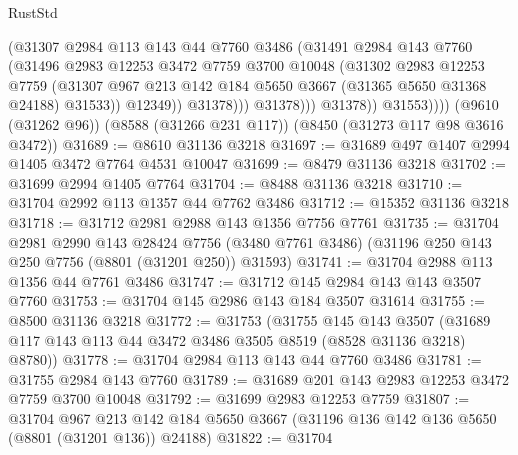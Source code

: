 \begin{lexlean}{RustStd}
\begin{coremodule}
                          (@31307
                            @2984
                            @113
                            @143
                            @44
                            @7760
                            @3486
                            (@31491
                              @2984
                              @143
                              @7760
                              (@31496
                                @2983
                                @12253
                                @3472
                                @7759
                                @3700
                                @10048
                                (@31302
                                  @2983
                                  @12253
                                  @7759
                                  (@31307
                                    @967
                                    @213
                                    @142
                                    @184
                                    @5650
                                    @3667
                                    (@31365 @5650 @31368 @24188)
                                    @31533))
                                @12349))
                            @31378)))
                      @31378)))
                @31378))
            @31553))))
    (@9610 (@31262 @96))
    (@8588 (@31266 @231 @117))
    (@8450 (@31273 @117 @98 @3616 @3472))
@31689 := @8610 @31136 @3218
@31697 := @31689 @497 @1407 @2994 @1405 @3472 @7764 @4531 @10047
@31699 := @8479 @31136 @3218
@31702 := @31699 @2994 @1405 @7764
@31704 := @8488 @31136 @3218
@31710 := @31704 @2992 @113 @1357 @44 @7762 @3486
@31712 := @15352 @31136 @3218
@31718 := @31712 @2981 @2988 @143 @1356 @7756 @7761
@31735 := @31704
    @2981
    @2990
    @143
    @28424
    @7756
    (@3480 @7761 @3486)
    (@31196 @250 @143 @250 @7756 (@8801 (@31201 @250)) @31593)
@31741 := @31704 @2988 @113 @1356 @44 @7761 @3486
@31747 := @31712 @145 @2984 @143 @143 @3507 @7760
@31753 := @31704 @145 @2986 @143 @184 @3507 @31614
@31755 := @8500 @31136 @3218
@31772 := @31753
    (@31755
      @145
      @143
      @3507
      (@31689 @117 @143 @113 @44 @3472 @3486 @3505 @8519 (@8528 @31136 @3218) @8780))
@31778 := @31704 @2984 @113 @143 @44 @7760 @3486
@31781 := @31755 @2984 @143 @7760
@31789 := @31689 @201 @143 @2983 @12253 @3472 @7759 @3700 @10048
@31792 := @31699 @2983 @12253 @7759
@31807 := @31704
    @967
    @213
    @142
    @184
    @5650
    @3667
    (@31196 @136 @142 @136 @5650 (@8801 (@31201 @136)) @24188)
@31822 := @31704

\end{coremodule}
\end{lexlean}
